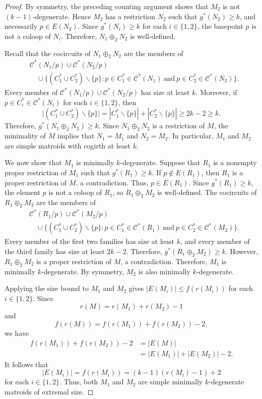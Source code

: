 \documentclass[10pt,a4paper]{amsart}
\newcommand{\cC}{\mathcal{C}}
\begin{document}
\begin{proof}
By symmetry, the preceding counting argument shows that $M_2$ is not $(k-1)$-degenerate. Hence $M_2$ has a restriction $N_2$ such that $g^*(N_2)\geq k$, and necessarily $p\in E(N_2)$. Since $g^*(N_i) \geq k$ for each $i \in \{1,2\}$, the basepoint $p$ is not a coloop of $N_i$. Therefore, $N_1\oplus_2 N_2$ is well-defined.

Recall that the cocircuits of $N_1\oplus_2 N_2$ are the members of
\begin{align*}
    &\cC^*(N_1/p)\cup\cC^*(N_2/p)\\
    &\quad\cup\bigl\{(C_1^*\cup C_2^*)\backslash\{p\}:
    p\in C_1^*\in\cC^*(N_1)\ \text{and}\
    p\in C_2^*\in\cC^*(N_2)\bigr\}.
\end{align*}
Every member of $\cC^*(N_1/p)\cup\cC^*(N_2/p)$ has size at least $k$. Moreover, if $p\in C_i^*\in\cC^*(N_i)$ for each $i\in\{1,2\}$, then
\[
    \bigl|(C_1^*\cup C_2^*)\backslash\{p\}\bigr|
    =|C_1^*\backslash\{p\}|+|C_2^*\backslash\{p\}|
    \geq 2k-2\geq k.
\]
Therefore, $g^*(N_1\oplus_2 N_2)\geq k$. Since $N_1\oplus_2 N_2$ is a restriction of $M$, the minimality of $M$ implies that $N_1=M_1$ and $N_2=M_2$. In particular, $M_1$ and $M_2$ are simple matroids with cogirth at least $k$.

We now show that $M_1$ is minimally $k$-degenerate. Suppose that $R_1$ is a nonempty proper restriction of $M_1$ such that $g^*(R_1)\geq k$. If $p\notin E(R_1)$, then $R_1$ is a proper restriction of $M$, a contradiction. Thus, $p\in E(R_1)$. Since $g^*(R_1)\geq k$, the element $p$ is not a coloop of $R_1$, so $R_1\oplus_2 M_2$ is well-defined. The cocircuits of $R_1\oplus_2 M_2$ are the members of
\begin{align*}
    &\cC^*(R_1/p)\cup\cC^*(M_2/p)\\
    &\quad\cup\bigl\{(C_1^*\cup C_2^*)\backslash\{p\}:
    p\in C_1^*\in\cC^*(R_1)\ \text{and}\
    p\in C_2^*\in\cC^*(M_2)\bigr\}.
\end{align*}
Every member of the first two families has size at least $k$, and every member of the third family has size at least $2k-2$. Therefore, $g^*(R_1\oplus_2 M_2)\geq k$. However, $R_1\oplus_2 M_2$ is a proper restriction of $M$, a contradiction. Therefore, $M_1$ is minimally $k$-degenerate. By symmetry, $M_2$ is also minimally $k$-degenerate.

Applying the size bound to $M_1$ and $M_2$ gives $|E(M_i)|\leq f(r(M_i))$ for each $i\in\{1,2\}$. Since
\[
    r(M)=r(M_1)+r(M_2)-1
\]
and
\[
    f(r(M))=f(r(M_1))+f(r(M_2))-2,
\]
we have
\begin{align*}
    f(r(M_1))+f(r(M_2))-2
    &=|E(M)|\\
    &=|E(M_1)|+|E(M_2)|-2.
\end{align*}
It follows that
\[
    |E(M_i)|=f(r(M_i))=(k-1)(r(M_i)-1)+2
\]
for each $i\in\{1,2\}$. Thus, both $M_1$ and $M_2$ are simple minimally $k$-degenerate matroids of extremal size.
\end{proof}
\end{document}
